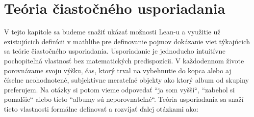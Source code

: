\documentclass[a4paper,10pt,oneside]{report}%
\begin{document}
\chapter{Teória čiastočného usporiadania}
    V tejto kapitole sa budeme snažiť ukázať možnosti Lean-u a využitie už existujúcich
definícii v mathlibe pre definovanie pojmov dokázanie viet týkajúcich sa teórie 
čiastočného usporiadania.
    Usporiadanie je jednoducho intuitívne pochopiteľná vlastnosť bez matematických
predispozícii.
    V každodennom živote porovnávame svoju výšku, čas, ktorý trval na vybehnutie do kopca
alebo aj číselne neohodnotené, subjektívne merateľné objekty ako ktorý album
od skupiny preferujem.
    Na otázky si potom vieme odpovedať ``ja som vyšší``, ``zabehol si pomalšie`` alebo
tieto ``albumy sú neporovnateľné``.
    Teória usporiadania sa snaží tieto vlastnosti formálne definovať a rozvíjať ďalej
otázkami ako:
\end{document}
